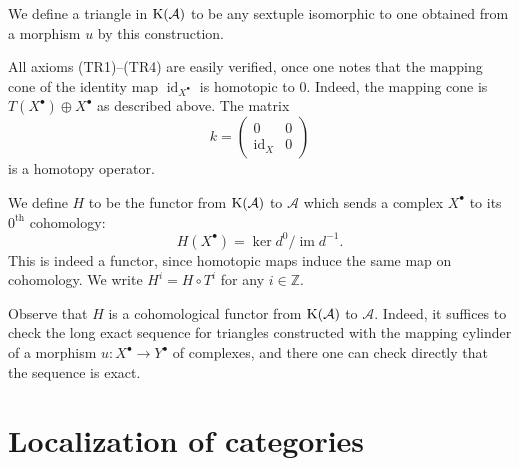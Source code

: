 We define a triangle in $\operatorname{K}(\mathcal{A})$ to be any sextuple isomorphic to one obtained from a morphism $u$ by this construction.

All axioms (TR1)--(TR4) are easily verified, once one notes that the mapping cone of the identity map $\operatorname{id}_{X^\bullet}$ is homotopic to $0$. Indeed, the mapping cone is
$T(X^\bullet)\oplus X^\bullet$ as described above. The matrix
\[
k = \begin{pmatrix} 0 & 0 \\ \operatorname{id}_X & 0 \end{pmatrix}
\]
is a homotopy operator.

\begin{definition*}
	We define $H$ to be the functor from $\operatorname{K}(\mathcal{A})$ to $\mathcal{A}$ which sends a complex $X^\bullet$ to its $0^\text{th}$ cohomology:
	\[
	H(X^\bullet) = \ker d^0 \big/ \operatorname{im} d^{-1}.
	\]
	This is indeed a functor, since homotopic maps induce the same map on cohomology. We write $H^i = H\circ T^i$ for any $i\in\mathbb{Z}$.
\end{definition*}

Observe that $H$ is a cohomological functor from $\operatorname{K}(\mathcal{A})$ to $\mathcal{A}$. Indeed, it suffices to check the long exact sequence for triangles constructed with the mapping cylinder of a morphism $u\colon X^\bullet\to Y^\bullet$ of complexes, and there one can check directly that the sequence is exact.

\section{Localization of categories}\label{sec:1.3}

